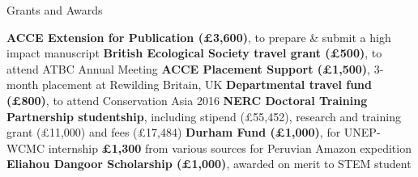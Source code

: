 \begin{rubric}{Grants and Awards}

\entry*[2018] \textbf{ACCE Extension for Publication (£3,600)}, to prepare \& submit a high impact manuscript
\entry*[2018] \textbf{British Ecological Society travel grant (£500)}, to attend ATBC Annual Meeting
\entry*[2016] \textbf{ACCE Placement Support (£1,500)}, 3-month placement at Rewilding Britain, UK
\entry*[2016] \textbf{Departmental travel fund (£800)}, to attend Conservation Asia 2016
\entry*[2014] \textbf{NERC Doctoral Training Partnership studentship}, including stipend (£55,452), research and training grant (£11,000) and fees (£17,484)
\entry*[2013] \textbf{Durham Fund (£1,000)}, for UNEP-WCMC internship
\entry*[2011] \textbf{£1,300} from various sources for Peruvian Amazon expedition
\entry*[2010] \textbf{Eliahou Dangoor Scholarship (£1,000)}, awarded on merit to STEM student
\end{rubric}
